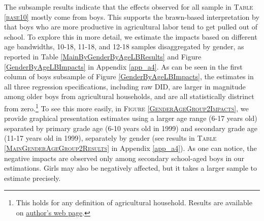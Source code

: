 \documentclass[12pt,letterpaper]{article}
\newcommand{\0}{\ensuremath{\mbox{\boldmath $0$}}}
\begin{document}
The subsample results indicate that the effects observed for all sample in \textsc{\small Table \ref{base10}} mostly come from boys. This supports the brawn-based interpretation by \cite{PittRosenzweigHassan2010} that boys who are more productive in agricultural labor tend to get pulled out of school. To explore this in more detail, we estimate the impacts based on different age bandwidths, 10-18, 11-18, and 12-18 samples disaggregated by gender, as reported in \textsf{\small Table \ref{MainByGenderByAgeLBResults}} and \textsf{\small Figure \ref{GenderByAgeLBImpacts}} in Appendix \ref{app_a4}. As can be seen in the first column of boys subsample of \textsf{\small Figure \ref{GenderByAgeLBImpacts}}, the estimates in all three regression specifications, including raw DID, are larger in magnitude among older boys from agricultural households, and are all statistically distrinct from zero.\footnote{This holds for any definition of agricultural household. Results are available on \href{https://seiroito.github.io/Ramadan/program/RamadanEstimationJDE_Tufte.html#by-different-age-cutoff}{author's web page}. } To see this more easily, in \textsc{\small Figure \ref{GenderAgeGroup2Impacts}}, we provide graphical presentation estimates using a larger age range (6-17 years old) separated by primary grade age (6-10 years old in 1999) and secondary grade age (11-17 years old in 1999), separately by gender (see results in \textsc{\small Table \ref{MainGenderAgeGroup2Results}} in Appendix \ref{app_a4}). As one can notice, the negative impacts are observed only among secondary school-aged boys in our estimations. Girls may also be negatively affected, but it takes a larger sample to estimate precisely.
\end{document}
